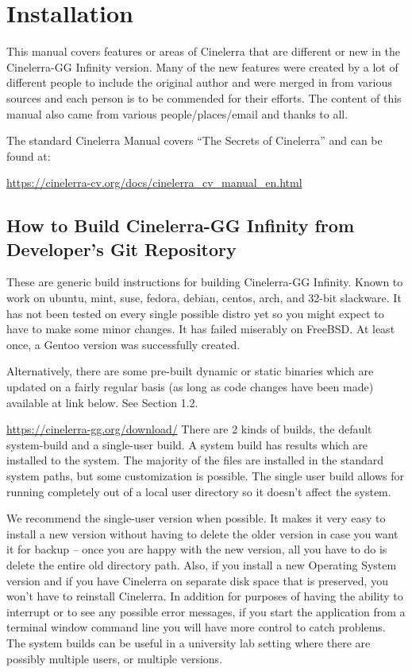 \chapter{Installation}
\label{cha:Instalation}

This manual covers features or areas of Cinelerra that are different or new in the Cinelerra-GG Infinity
version. Many of the new features were created by a lot of different people to include the original
author and were merged in from various sources and each person is to be commended for their efforts.
The content of this manual also came from various people/places/email and thanks to all.

The standard Cinelerra Manual covers “The Secrets of Cinelerra” and can be found at:\par
\url{
https://cinelerra-cv.org/docs/cinelerra_cv_manual_en.html
}
\section{How to Build Cinelerra-GG Infinity from Developer's Git Repository}%
\label{sec:}

These are generic build instructions for building Cinelerra-GG Infinity. Known to work on ubuntu,
mint, suse, fedora, debian, centos, arch, and 32-bit slackware. It has not been tested on every single
possible distro yet so you might expect to have to make some minor changes. It has failed miserably
on FreeBSD. At least once, a Gentoo version was successfully created.

Alternatively, there are some pre-built dynamic or static binaries which are updated on a fairly regular
basis (as long as code changes have been made) available at link below. See Section 1.2.

\url{https://cinelerra-gg.org/download/}
    There are 2 kinds of builds, the default system-build and a single-user build. A system build has results
which are installed to the system. The majority of the files are installed in the standard system paths,
but some customization is possible. The single user build allows for running completely out of a local
user directory so it doesn't affect the system.

We recommend the single-user version when possible. It makes it very easy to install a new version
without having to delete the older version in case you want it for backup – once you are happy with the
new version, all you have to do is delete the entire old directory path. Also, if you install a new
Operating System version and if you have Cinelerra on separate disk space that is preserved, you won't
have to reinstall Cinelerra. In addition for purposes of having the ability to interrupt or to see any
possible error messages, if you start the application from a terminal window command line you will
have more control to catch problems. The system builds can be useful in a university lab setting where
there are possibly multiple users, or multiple versions.


